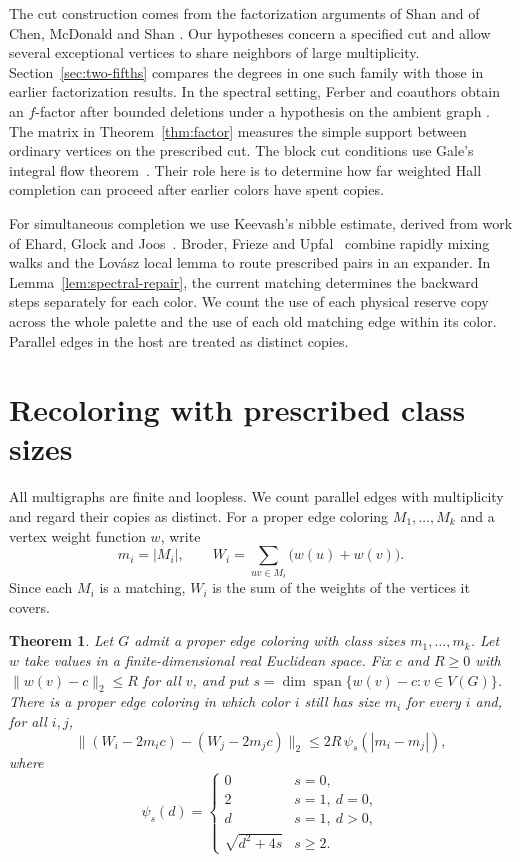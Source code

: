 \documentclass[11pt]{article}
\DeclareMathOperator{\spanof}{span}
\newtheorem{theorem}{Theorem}
\begin{document}
The cut construction comes from the factorization arguments of Shan and of Chen, McDonald and Shan \cite{Shan,CMS}. Our hypotheses concern a specified cut and allow several exceptional vertices to share neighbors of large multiplicity. Section~\ref{sec:two-fifths} compares the degrees in one such family with those in earlier factorization results. In the spectral setting, Ferber and coauthors obtain an \(f\)-factor after bounded deletions under a hypothesis on the ambient graph \cite[Lemma~4.5]{FFMYZ}. The matrix in Theorem~\ref{thm:factor} measures the simple support between ordinary vertices on the prescribed cut. The block cut conditions use Gale's integral flow theorem~\cite{Gale}. Their role here is to determine how far weighted Hall completion can proceed after earlier colors have spent copies.

For simultaneous completion we use Keevash's nibble estimate, derived from work of Ehard, Glock and Joos~\cite{KeevashII,EGJ}. Broder, Frieze and Upfal~\cite{BFU} combine rapidly mixing walks and the Lov\'asz local lemma to route prescribed pairs in an expander. In Lemma~\ref{lem:spectral-repair}, the current matching determines the backward steps separately for each color. We count the use of each physical reserve copy across the whole palette and the use of each old matching edge within its color. Parallel edges in the host are treated as distinct copies.

\section{Recoloring with prescribed class sizes}\label{sec:weights}

All multigraphs are finite and loopless. We count parallel edges with multiplicity and regard their copies as distinct. For a proper edge coloring \(M_1,\ldots,M_k\) and a vertex weight function \(w\), write
\[
  m_i=|M_i|,\qquad W_i=\sum_{uv\in M_i}\bigl(w(u)+w(v)\bigr).
\]
Since each \(M_i\) is a matching, \(W_i\) is the sum of the weights of the vertices it covers.

\begin{theorem}\label{thm:balance}
Let \(G\) admit a proper edge coloring with class sizes \(m_1,\ldots,m_k\). Let \(w\) take values in a finite-dimensional real Euclidean space. Fix \(c\) and \(R\ge0\) with \(\|w(v)-c\|_2\le R\) for all \(v\), and put \(s=\dim\spanof\{w(v)-c:v\in V(G)\}\). There is a proper edge coloring in which color \(i\) still has size \(m_i\) for every \(i\) and, for all \(i,j\),
\[
  \|(W_i-2m_i c)-(W_j-2m_j c)\|_2
  \le 2R\,\psi_s(|m_i-m_j|),
\]
where
\[
 \psi_s(d)=
 \begin{cases}
   0 & s=0,\\
   2 & s=1,\ d=0,\\
   d & s=1,\ d>0,\\
   \sqrt{d^2+4s} & s\ge2.
 \end{cases}
\]
\end{theorem}
\end{document}
